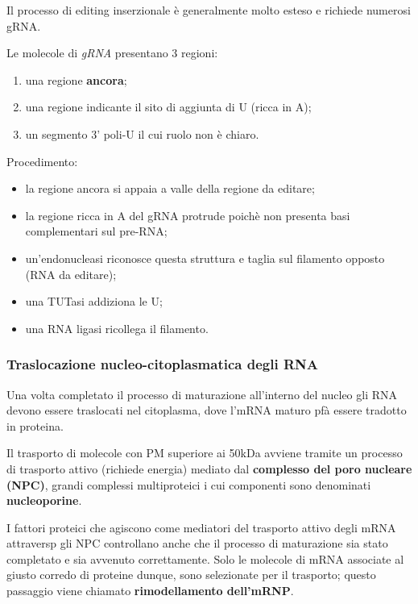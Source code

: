 \documentclass[]{article}
\begin{document}
Il processo di editing inserzionale è generalmente molto esteso e
richiede numerosi gRNA.

Le molecole di \emph{gRNA} presentano 3 regioni:

\begin{enumerate}
\def\labelenumi{\arabic{enumi}.}
\itemsep1pt\parskip0pt
\item
  una regione \textbf{ancora};
\item
  una regione indicante il sito di aggiunta di U (ricca in A);
\item
  un segmento 3' poli-U il cui ruolo non è chiaro.
\end{enumerate}

Procedimento:

\begin{itemize}
\itemsep1pt\parskip0pt
\item
  la regione ancora si appaia a valle della regione da editare;
\item
  la regione ricca in A del gRNA protrude poichè non presenta basi
  complementari sul pre-RNA;
\item
  un'endonucleasi riconosce questa struttura e taglia sul filamento
  opposto (RNA da editare);
\item
  una TUTasi addiziona le U;
\item
  una RNA ligasi ricollega il filamento.
\end{itemize}

\subsubsection{Traslocazione nucleo-citoplasmatica degli
RNA}\label{traslocazione-nucleo-citoplasmatica-degli-rna}

Una volta completato il processo di maturazione all'interno del nucleo
gli RNA devono essere traslocati nel citoplasma, dove l'mRNA maturo pfà
essere tradotto in proteina.

Il trasporto di molecole con PM superiore ai 50kDa avviene tramite un
processo di trasporto attivo (richiede energia) mediato dal
\textbf{complesso del poro nucleare (NPC)}, grandi complessi
multiproteici i cui componenti sono denominati \textbf{nucleoporine}.

I fattori proteici che agiscono come mediatori del trasporto attivo
degli mRNA attraversp gli NPC controllano anche che il processo di
maturazione sia stato completato e sia avvenuto correttamente. Solo le
molecole di mRNA associate al giusto corredo di proteine dunque, sono
selezionate per il trasporto; questo passaggio viene chiamato
\textbf{rimodellamento dell'mRNP}.
\end{document}
